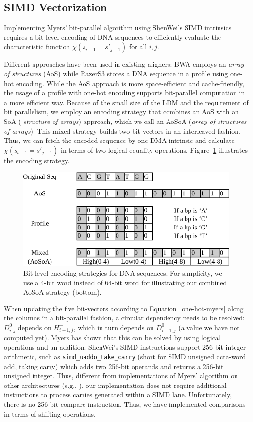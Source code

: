\subsection{SIMD Vectorization}

Implementing Myers' bit-parallel algorithm using ShenWei's SIMD
intrinsics requires a bit-level encoding of DNA sequences to
efficiently evaluate the characteristic function $\chi(s_{i-1} =
s'_{j-1})$ for all $i, j$.

Different approaches have been used in existing aligners: BWA
\cite{bwa} employs an {\em array of structures} (AoS) while RazerS3
\cite{razers3} stores a DNA sequence in a profile using one-hot
encoding. While the AoS approach is more space-efficient and
cache-friendly, the usage of a profile with one-hot encoding supports
bit-parallel computation in a more efficient way.  Because of the
small size of the LDM and the requirement of bit parallelism, we
employ an encoding strategy that combines an AoS with an SoA ({\em
  structure of arrays}) approach, which we call an AoSoA ({\em array
  of structures of arrays}). This mixed strategy builds two
bit-vectors in an interleaved fashion. Thus, we can fetch the encoded
sequence by one DMA-intrinsic and calculate $\chi(s_{i-1} = s'_{j-1})$
in terms of two logical equality operations. Figure~\ref{MixPack}
illustrates the encoding strategy.

\begin{figure}[!htb]
  \includegraphics[width=0.9\linewidth]{figures/MixPack}
  \caption{Bit-level encoding strategies for DNA sequences. For
    simplicity, we use a 4-bit word instead of 64-bit word for
    illustrating our combined AoSoA strategy (bottom).}
  \label{MixPack}
\end{figure}

When updating the five bit-vectors according to
Equation~\ref{one-hot-myers} along the columns in a bit-parallel
fashion, a circular dependency needs to be resolved: $D^0_{i,j}$
depends on $H^-_{i-1, j}$, which in turn depends on $D^0_{i-1,j}$ (a
value we have not computed yet). Myers \cite{myers} has shown that
this can be solved by using logical operations and an
addition. ShenWei's SIMD instructions support 256-bit integer
arithmetic, such as \texttt{simd\_uaddo\_take\_carry} (short for SIMD
unsigned octa-word add, taking carry) which adds two 256-bit operands
and returns a 256-bit unsigned integer. Thus, different from
implementations of Myers' algorithm on other architectures (e.g.,
\cite{chacon}), our implementation does not require additional
instructions to process carries generated within a SIMD
lane. Unfortunately, there is no 256-bit compare instruction. Thus, we
have implemented comparisons in terms of shifting operations.

